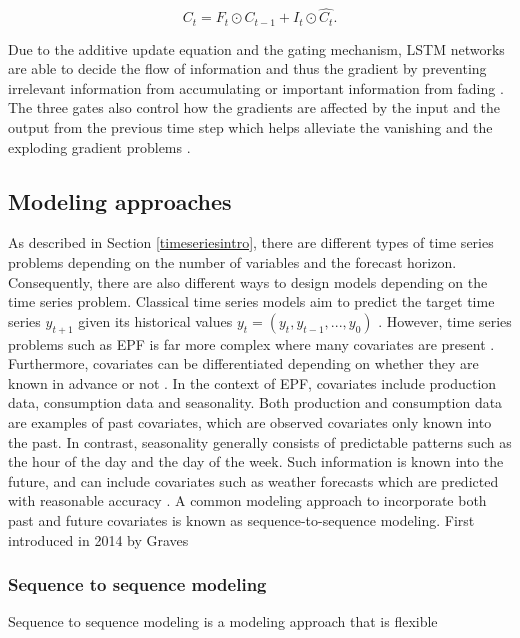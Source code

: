 \begin{equation}
    C_{t} = F_{t} \odot C_{t-1} + I_{t} \odot \hat{C_{t}}.
\end{equation}

Due to the additive update equation and the gating mechanism, LSTM networks are able to decide the flow of information and thus the gradient by preventing irrelevant information from accumulating or important information from fading \cite{LSTM}. The three gates also control how the gradients are affected by the input and the output from the previous time step which helps alleviate the vanishing and the exploding gradient problems \cite{diveLSTM}. 

\subsection{Modeling approaches}
As described in Section \ref{timeseriesintro}, there are different types of time series problems depending on the number of variables and the forecast horizon. Consequently, there are also different ways to design models depending on the time series problem. Classical time series models aim to predict the target time series $y_{t+1}$ given its historical values $y_{t} = (y_{t}, y_{t-1}, ... , y_{0})$ \cite{mqrnn}. However, time series problems such as EPF is far more complex where many covariates are present \cite{mqrnn}. Furthermore, covariates can be differentiated depending on whether they are known in advance or not \cite{darts}. In the context of EPF, covariates include production data, consumption data and seasonality. Both production and consumption data are examples of past covariates, which are observed covariates only known into the past. In contrast, seasonality generally consists of predictable patterns such as the hour of the day and the day of the week. Such information is known into the future, and can include covariates such as weather forecasts which are predicted with reasonable accuracy \cite{smhiprognos}. A common modeling approach to incorporate both past and future covariates is known as sequence-to-sequence modeling. First introduced in 2014 by Graves \cite{graves}

\subsubsection{Sequence to sequence modeling}
Sequence to sequence modeling is a modeling approach that is flexible 


